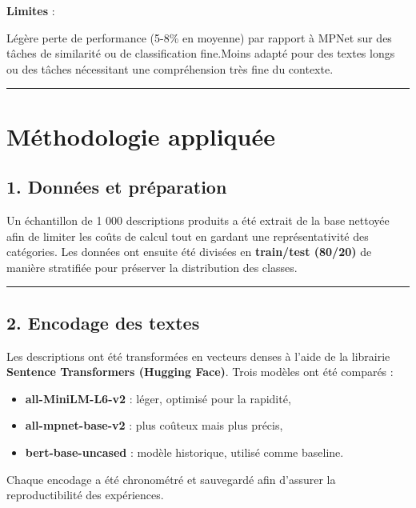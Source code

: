 \documentclass[
  french,
  letterpaper,
  DIV=11,
  numbers=noendperiod]{scrartcl}
\providecommand{\tightlist}{%
  \setlength{\itemsep}{0pt}\setlength{\parskip}{0pt}}
\begin{document}
\textbf{Limites} :

Légère perte de performance (5-8\% en moyenne) par rapport à MPNet sur
des tâches de similarité ou de classification fine.Moins adapté pour des
textes longs ou des tâches nécessitant une compréhension très fine du
contexte.

\begin{center}\rule{0.5\linewidth}{0.5pt}\end{center}

\section{Méthodologie appliquée}\label{muxe9thodologie-appliquuxe9e}

\subsection{1. Données et
préparation}\label{donnuxe9es-et-pruxe9paration}

Un échantillon de 1 000 descriptions produits a été extrait de la base
nettoyée afin de limiter les coûts de calcul tout en gardant une
représentativité des catégories. Les données ont ensuite été divisées en
\textbf{train/test (80/20)} de manière stratifiée pour préserver la
distribution des classes.

\begin{center}\rule{0.5\linewidth}{0.5pt}\end{center}

\subsection{2. Encodage des textes}\label{encodage-des-textes}

Les descriptions ont été transformées en vecteurs denses à l'aide de la
librairie \textbf{Sentence Transformers (Hugging Face)}. Trois modèles
ont été comparés :

\begin{itemize}
\tightlist
\item
  \textbf{all-MiniLM-L6-v2} : léger, optimisé pour la rapidité,
\item
  \textbf{all-mpnet-base-v2} : plus coûteux mais plus précis,
\item
  \textbf{bert-base-uncased} : modèle historique, utilisé comme
  baseline.
\end{itemize}

Chaque encodage a été chronométré et sauvegardé afin d'assurer la
reproductibilité des expériences.
\end{document}
